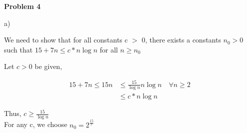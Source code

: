 \documentclass[12pt]{article}
\begin{document}
	
	\begin{center}
		{\Large\bf Problem 4}\\
		\vspace{3mm}
	\end{center}
	
	\def\question#1{\item[\bf #1.]}
	\def\part#1{\item[\bf #1)]}
	\newcommand{\pc}[1]{\mbox{\textbf{#1}}} %
	
	
	
	a)
	
	We need to show that for all constants c $>$ 0, there exists a constants $n_0 > 0$ such that $15+7n \leq c*n\log n$ for all $n \geq n_0$
	
	
	Let $c>0$ be given,
	\begin{center}
		\begin{align*}
			15+7n \leq 15n &\leq \frac{15}{\log n} n \log n \quad \forall n \geq 2\\
			&\leq c*n\log n
		\end{align*}
	\end{center}
	Thus, $c \geq \frac{15}{\log n}$\\
	For any c, we choose $n_0 = 2^{\frac{15}{c}}$\\
	
	

\end{document}
